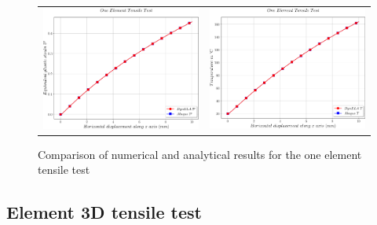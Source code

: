 \begin{figure}[h]
\begin{centering}
\begin{tabular}{cc}
\includegraphics[width=0.45\columnwidth]{Figures/Samples/Element/Tensile_plasticStrain} & \includegraphics[width=0.45\columnwidth]{Figures/Samples/Element/Tensile_temperature}\tabularnewline
\end{tabular}
\par\end{centering}
\caption{Comparison of numerical and analytical results for the one element
tensile test\label{fig:Samples!Single!Tensile-Comparison}}
\end{figure}
\clearpage

\subsection{Element 3D tensile test}


